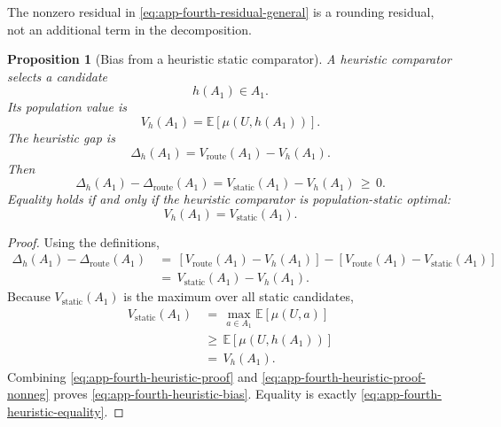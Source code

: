\documentclass{article} %
\newtheorem{proposition}[theorem]{Proposition}
\begin{document}
The nonzero residual in \eqref{eq:app-fourth-residual-general} is a rounding residual, not an additional term in the decomposition.

\begin{proposition}[Bias from a heuristic static comparator]
\label{prop:7}
A heuristic comparator selects a candidate
\begin{equation}
\label{eq:app-fourth-heuristic-h}
h(A_1)\in A_1.
\end{equation}
Its population value is
\begin{equation}
\label{eq:app-fourth-heuristic-vh}
V_h(A_1)
=
\mathbb{E}[\mu(U,h(A_1))].
\end{equation}
The heuristic gap is
\begin{equation}
\label{eq:app-fourth-heuristic-dh}
\Delta_h(A_1)
=
V_{\mathrm{route}}(A_1)-V_h(A_1).
\end{equation}
Then
\begin{equation}
\label{eq:app-fourth-heuristic-bias}
\Delta_h(A_1)
-
\Delta_{\mathrm{route}}(A_1)
=
V_{\mathrm{static}}(A_1)-V_h(A_1)
\,\ge\,
0.
\end{equation}
Equality holds if and only if the heuristic comparator is population-static optimal:
\begin{equation}
\label{eq:app-fourth-heuristic-equality}
V_h(A_1)
=
V_{\mathrm{static}}(A_1).
\end{equation}
\end{proposition}

\begin{proof}
Using the definitions,
\begin{align}
\label{eq:app-fourth-heuristic-proof}
\Delta_h(A_1)
-
\Delta_{\mathrm{route}}(A_1)
&\,=\,
\left[
V_{\mathrm{route}}(A_1)-V_h(A_1)
\right]
-
\left[
V_{\mathrm{route}}(A_1)-V_{\mathrm{static}}(A_1)
\right]
\\
&\,=\,
V_{\mathrm{static}}(A_1)-V_h(A_1).
\end{align}
Because \(V_{\mathrm{static}}(A_1)\) is the maximum over all static candidates,
\begin{align}
\label{eq:app-fourth-heuristic-proof-nonneg}
V_{\mathrm{static}}(A_1)
&\,=\,
\max_{a\in A_1}
\mathbb{E}[\mu(U,a)]
\\
&\,\ge\,
\mathbb{E}[\mu(U,h(A_1))]
\\
&\,=\,
V_h(A_1).
\end{align}
Combining \eqref{eq:app-fourth-heuristic-proof} and \eqref{eq:app-fourth-heuristic-proof-nonneg} proves \eqref{eq:app-fourth-heuristic-bias}.  Equality is exactly \eqref{eq:app-fourth-heuristic-equality}.
\end{proof}
\end{document}
